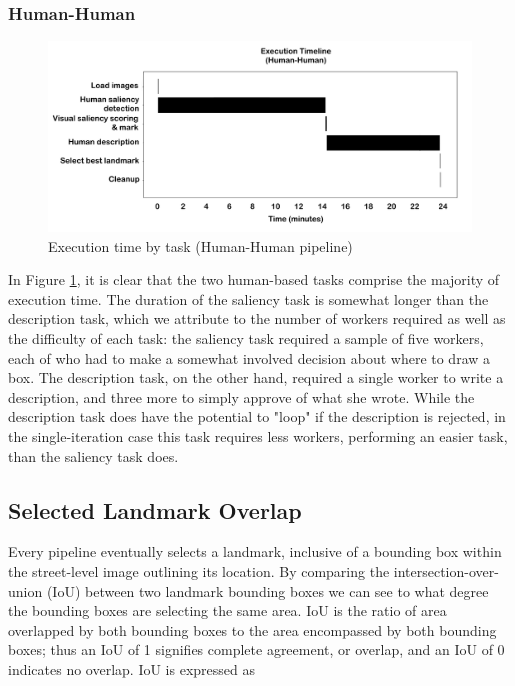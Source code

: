 \subsubsection{Human-Human}
\begin{figure}[htbp]
  \centering
  \includegraphics[width=\textwidth]{images/timeline_hh.pdf}
  \caption{Execution time by task (Human-Human pipeline)}
  \label{fig:plot:timeline:hh}
\end{figure}

In Figure \ref{fig:plot:timeline:hh}, it is clear that the two human-based tasks comprise the majority of execution time. The duration of the saliency task is somewhat longer than the description task, which we attribute to the number of workers required as well as the difficulty of each task: the saliency task required a sample of five workers, each of who had to make a somewhat involved decision about where to draw a box. The description task, on the other hand, required a single worker to write a description, and three more to simply approve of what she wrote. While the description task does have the potential to "loop" if the description is rejected, in the single-iteration case this task requires less workers, performing an easier task, than the saliency task does.

\subsection{Selected Landmark Overlap}

Every pipeline eventually selects a landmark, inclusive of a bounding box within the street-level image outlining its location. By comparing the intersection-over-union (IoU) between two landmark bounding boxes we can see to what degree the bounding boxes are selecting the same area. IoU is the ratio of area overlapped by both bounding boxes to the area encompassed by both bounding boxes; thus an IoU of 1 signifies complete agreement, or overlap, and an IoU of 0 indicates no overlap. IoU is expressed as

